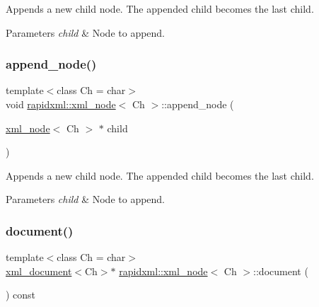 Appends a new child node. The appended child becomes the last child. 
\begin{DoxyParams}{Parameters}
{\em child} & Node to append. \\
\hline
\end{DoxyParams}
\mbox{\label{classrapidxml_1_1xml__node_a8696d098ecc9c4d2a646b43e91d58e31}} 
\subsubsection{\texorpdfstring{append\+\_\+node()}{append\_node()}\hspace{0.1cm}{\footnotesize\ttfamily [2/2]}}
{\footnotesize\ttfamily template$<$class Ch = char$>$ \\
void \mbox{\hyperlink{classrapidxml_1_1xml__node}{rapidxml\+::xml\+\_\+node}}$<$ Ch $>$\+::append\+\_\+node (\begin{DoxyParamCaption}\item[{\mbox{\hyperlink{classrapidxml_1_1xml__node}{xml\+\_\+node}}$<$ Ch $>$ $\ast$}]{child }\end{DoxyParamCaption})\hspace{0.3cm}{\ttfamily [inline]}}

Appends a new child node. The appended child becomes the last child. 
\begin{DoxyParams}{Parameters}
{\em child} & Node to append. \\
\hline
\end{DoxyParams}
\mbox{\label{classrapidxml_1_1xml__node_af23d2d56182411e9261ca6974bfd767f}} 
\subsubsection{\texorpdfstring{document()}{document()}\hspace{0.1cm}{\footnotesize\ttfamily [1/2]}}
{\footnotesize\ttfamily template$<$class Ch = char$>$ \\
\mbox{\hyperlink{classrapidxml_1_1xml__document}{xml\+\_\+document}}$<$Ch$>$$\ast$ \mbox{\hyperlink{classrapidxml_1_1xml__node}{rapidxml\+::xml\+\_\+node}}$<$ Ch $>$\+::document (\begin{DoxyParamCaption}{ }\end{DoxyParamCaption}) const\hspace{0.3cm}{\ttfamily [inline]}}

